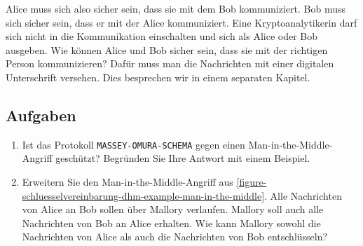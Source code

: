 Alice muss sich also sicher sein, dass sie mit dem  Bob kommuniziert. Bob muss sich sicher sein, dass er mit der  Alice kommuniziert. Eine Kryptoanalytikerin darf sich nicht in die Kommunikation einschalten und sich als Alice oder Bob ausgeben. Wie können Alice und Bob sicher sein, dass sie mit der richtigen Person kommunizieren? Dafür muss man die Nachrichten mit einer digitalen Unterschrift versehen. Dies besprechen wir in einem separaten Kapitel.

\subsection{Aufgaben}

\begin{enumerate}
	\item Ist das Protokoll \texttt{MASSEY-OMURA-SCHEMA} gegen einen Man-in-the-Middle-Angriff geschützt? Begründen Sie Ihre Antwort mit einem Beispiel.
	\item Erweitern Sie den Man-in-the-Middle-Angriff aus \autoref{figure-schluesselvereinbarung-dhm-example-man-in-the-middle}. Alle Nachrichten von Alice an Bob sollen über Mallory verlaufen. Mallory soll auch alle Nachrichten von Bob an Alice erhalten. Wie kann Mallory sowohl die Nachrichten von Alice als auch die Nachrichten von Bob entschlüsseln?
\end{enumerate}